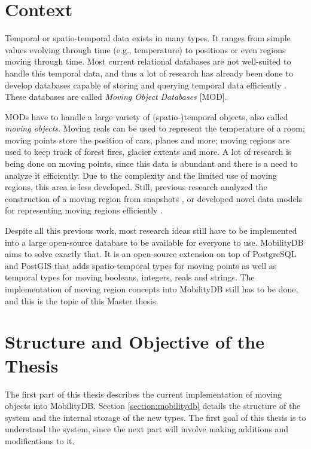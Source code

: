 
\section{Context}

Temporal or spatio-temporal data exists in many types. It ranges from simple values evolving through time (e.g., temperature) to positions or even regions moving through time. Most current relational databases are not well-suited to handle this temporal data, and thus a lot of research has already been done to develop databases capable of storing and querying temporal data efficiently \cite{moving_obj_databases}. These databases are called \textit{Moving Object Databases} [MOD].

MODs have to handle a large variety of (spatio-)temporal objects, also called \textit{moving objects}. Moving reals can be used to represent the temperature of a room; moving points store the position of cars, planes and more; moving regions are used to keep track of forest fires, glacier extents and more. A lot of research is being done on moving points, since this data is abundant and there is a need to analyze it efficiently. Due to the complexity and the limited use of moving regions, this area is less developed. Still, previous research analyzed the construction of a moving region from snapshots \cite{repr_from_obs,high_quality_interpol}, or developed novel data models for representing moving regions efficiently \cite{polyhedra,fmregion}.

Despite all this previous work, most research ideas still have to be implemented into a large open-source database to be available for everyone to use. MobilityDB \cite{mobilitydb} aims to solve exactly that. It is an open-source extension on top of PostgreSQL \cite{postgresql} and PostGIS \cite{postgis} that adds spatio-temporal types for moving points as well as temporal types for moving booleans, integers, reals and strings. The implementation of moving region concepts into MobilityDB still has to be done, and this is the topic of this Master thesis.

\section{Structure and Objective of the Thesis}

The first part of this thesis describes the current implementation of moving objects into MobilityDB. Section \ref{section:mobilitydb} details the structure of the system and the internal storage of the new types. The first goal of this thesis is to understand the system, since the next part will involve making additions and modifications to it.


